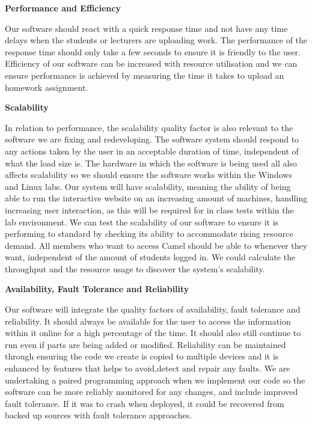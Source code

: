 \documentclass[12pt]{article}
\begin{document}
	\textbf{Performance and Efficiency} 
    
Our software should react with a quick response time and not have any time delays when the students or lecturers are uploading work. The performance of the response time should only take a few seconds to ensure it is friendly to the user. Efficiency of our software can be increased with resource utilisation and we can ensure performance is achieved by measuring the time it takes to upload an homework assignment. 

	\newpage
    
    \textbf{Scalability}   
    
In relation to performance, the scalability quality factor is also relevant to the software we are fixing and redeveloping. The software system should respond to any actions taken by the user in an acceptable duration of time, independent of what the load size is. The hardware in which the software is being used all also affects scalability so we should ensure the software works within the Windows and Linux labs. Our system will have scalability, meaning the ability of being able to run the interactive website on an increasing amount of machines, handling increasing user interaction, as this will be required for in class tests within the lab environment. We can test the scalability of our software to ensure it is performing to standard by checking its ability to accommodate rising resource demand. All members who want to access Camel should be able to whenever they want, independent of the amount of students logged in. We could calculate the throughput and the resource usage to discover the system's scalability.
        
	\textbf{Availability, Fault Tolerance and Reliability}   

Our software will integrate the quality factors of availability, fault tolerance and reliability. It should always be available for the user to access the information within it online for a high percentage of the time. It should also still continue to run even if parts are being added or modified. Reliability can be maintained through ensuring the code we create is copied to multiple devices and it is enhanced by features that helps to avoid,detect and repair any faults. We are undertaking a paired programming approach when we implement our code so the software can be more reliably monitored for any changes, and include improved fault tolerance. If it was to crash when deployed, it could be recovered from backed up sources with fault tolerance approaches.
\end{document}

